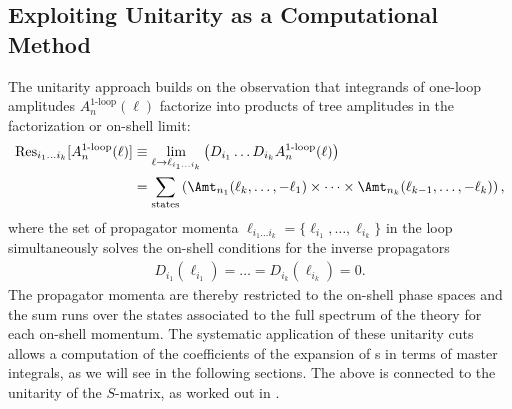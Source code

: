 \subsection{Exploiting Unitarity as a Computational Method}
\label{sec:unimeth}
The unitarity approach builds on the observation that integrands of one-loop amplitudes $A_n^{\text{1-loop}}(\ell)$ factorize into products of tree amplitudes in the
factorization or on-shell limit:
\begin{align}\label{eq:faclimit}
\begin{split}
 \text{Res}_{i_1\dots i_k}[A_n^{\text{1-loop}}(\ell)]&\equiv\lim_{\ell\rightarrow
    \ell_{i_1\dots i_k}}\left(D_{i_1}\dots
    D_{i_k}A_n^{\text{1-loop}}(\ell)\right)\\
&=\sum_{\text{states}}\left(\Amt_{n_1}(\ell_k,\dots,-\ell_1) \times \dots
    \times \Amt_{n_k}(\ell_{k-1},\dots,-\ell_k) \right),
\end{split}
\end{align}
where the set of propagator momenta $\ell_{i_1\dots
  i_k}=\{\ell_{i_1},\dots,\ell_{i_k}\}$ in the loop simultaneously solves the
on-shell conditions for the inverse propagators
\begin{align}\label{eq:simloop}
D_{i_1}(\ell_{i_1}) = \dots
= D_{i_k} (\ell_{i_k}) = 0.
\end{align}
The propagator momenta are thereby restricted to the on-shell phase spaces
and the sum runs over the states associated to the full spectrum of the
theory for each on-shell momentum. The systematic application of
these unitarity cuts allows a computation of the coefficients of the
expansion of \ola s in terms of master integrals, as we will
see in the following sections. The above is connected to the
unitarity of the $S$-matrix, as worked out in \cite{Eden:1966dnq}.

